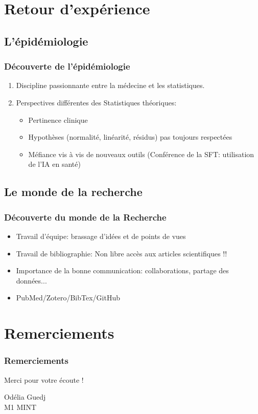 \documentclass{beamer}
\begin{document}
\section{Retour d'expérience}
\subsection{L'épidémiologie}
\begin{frame}
\frametitle{Découverte de l'épidémiologie}
\begin{enumerate}
\pause
\item Discipline passionnante entre la médecine et les statistiques.
\pause
\item Perspectives différentes des Statistiques théoriques: 
\begin{itemize}
\pause
\item Pertinence clinique
\pause
\item Hypothèses (normalité, linéarité, résidus) pas toujours respectées
\pause
\item Méfiance vis à vis de nouveaux outils (Conférence de la SFT: utilisation de l'IA en santé)
\end{itemize} 
\end{enumerate}
\end{frame}

\subsection{Le monde de la recherche}
\begin{frame}
\frametitle{Découverte du monde de la Recherche}
\begin{itemize}
\pause
\item Travail d'équipe: brassage d'idées et de points de vues
\pause
\item Travail de bibliographie: Non libre accès aux articles scientifiques !!
\pause
\item Importance de la bonne communication: collaborations, partage des données...
\pause
\item PubMed/Zotero/BibTex/GitHub
\end{itemize}
\end{frame}

\section{Remerciements}
\begin{frame}
\frametitle{Remerciements}
\bigskip
\begin{center}
Merci pour votre écoute !
\end{center}
\bigskip
\bigskip
\bigskip
\bigskip
\bigskip
\bigskip
\bigskip
\begin{flushright}
Odélia Guedj\\
M1 MINT\\
\end{flushright}
\end{frame}
\end{document}
